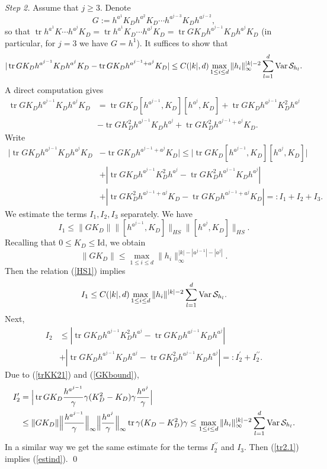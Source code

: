 \documentclass{article}
\numberwithin{equation}{section}
\newcommand{\SSS}{{\cal S}}
\newcommand{\ga}{\gamma}
\newcommand{\tr}{\operatorname{tr}}
\newcommand{\Var}{\operatorname{Var}}
\newcommand{\fr}{\frac}
\newcommand{\sli}{\sum\limits}
\newcommand{\lbl}{\label}
\newcommand{\bee}{\begin{equation}}
\newcommand{\eee}{\end{equation}}
\newcommand{\non}{\nonumber}
\begin{document}
{\it Step 2.} Assume that $j\geq 3$. Denote
\bee\lbl{GGG}
G:=h^{a^1}K_Dh^{a^2}K_D\cdots h^{a^{j-3}}K_Dh^{a^{j-2}},
\eee
so that
$\tr h^{a^1}K\cdots h^{a^j}K_D=\tr h^{a^1}K_D\cdots h^{a^j}K_D
= \tr G K_Dh^{a^{j-1}}K_Dh^{a^j}K_D$
(in particular, for $j=3$ we have $G=h^1$).
It suffices to show that
\bee\lbl{estind}
|\tr G K_Dh^{a^{j-1}}K_Dh^{a^j}K_D-\tr GK_D h^{a^{j-1}+a^j}K_D|\leq C(|k|, d)\max\limits_{1\leq i\leq
d}\|h_i\|^{|k|-2}_\infty\sli_{l=1}^d\Var \SSS_{h_l}.
\eee
A direct computation gives
\begin{align}\non
\tr G K_Dh^{a^{j-1}}K_Dh^{a^j}K_D &= \tr GK_D[h^{a^{j-1}},K_D][h^{a^j},K_D]
+\tr GK_Dh^{a^{j-1}}K_D^2h^{a^j}  \\ \lbl{tr2.0}
&-\tr GK_D^2h^{a^{j-1}}K_Dh^{a^j}
+ \tr GK_D^2h^{a^{j-1}+a^j}K_D.
\end{align}
Write
\begin{align}\non
|\tr G K_Dh^{a^{j-1}}K_Dh^{a^j}K_D&-\tr GK_D h^{a^{j-1}+a^j}K_D|
\leq |\tr GK_D[h^{a^{j-1}},K_D][h^{a^j},K_D]|
\\ \lbl{tr2.1}
&+|\tr GK_Dh^{a^{j-1}}K_D^2h^{a^j}
-\tr GK_D^2h^{a^{j-1}}K_Dh^{a^j}|  \\ \non
&+|\tr GK_D^2h^{a^{j-1}+a^j}K_D-\tr GK_D h^{a^{j-1}+a^j}K_D|=: I_1+I_2+I_3.
\end{align}
We estimate the terms $I_1,I_2,I_3$ separately. We have
\bee\lbl{tr2.1'}
I_1\leq \|GK_D\|\|[h^{a^{j-1}}, K_D]\|_{HS}\|[h^{a^j},K_D]\|_{HS}.
\eee
Recalling that $0\leq K_D\leq \mbox{Id}$, we obtain
\bee\lbl{GKbound}
\|GK_D\|\leq \max\limits_{1\leq i \leq d}\|h_i\|_\infty^{|k|-|a^{j-1}|-|a^j|}.
\eee
Then the relation (\ref{HS1}) implies
\bee\non
I_1\leq C(|k|, d)\max\limits_{1\leq i \leq d}\|h_i\|^{|k|-2}
\sli_{l=1}^d \Var\SSS_{h_l}.
\eee
Next,
\begin{align} \non
I_2&\leq |\tr GK_Dh^{a^{j-1}}K_D^2h^{a^j}-\tr GK_Dh^{a^{j-1}}K_Dh^{a^j}| \\ \non
&+|\tr GK_Dh^{a^{j-1}}K_Dh^{a^j}-\tr GK_D^2h^{a^{j-1}}K_Dh^{a^j}|=:I_2^\prime+I_2^{\prime\prime}.
\end{align}
Due to (\ref{trKK21}) and (\ref{GKbound}),
\begin{align}\non
I_2^\prime&=\Big|\tr GK_D \frac{h^{a^{j-1}}}{\ga}\ga(K_D^2-K_D)\ga\fr{h^{a^j}}{\ga}\Big| \\ \non
&\leq \|GK_D\|\Big\|\fr{h^{a^{j-1}}}{\ga}\Big\|_\infty \Big\|\fr{h^{a^j}}{\ga}\Big\|_\infty
\tr \ga(K_D-K_D^2)\ga
\leq \max\limits_{1\leq i\leq d}\|h_i\|^{|k|-2}_\infty\sli_{l=1}^d\Var \SSS_{h_l}.
\end{align}
In a similar way we get the same estimate for the terms $I_2^{\prime\prime}$ and $I_3$.
Then (\ref{tr2.1}) implies (\ref{estind}).
\qed
\end{document}
